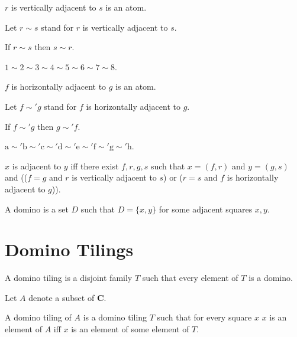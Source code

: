 \documentclass{article}
\newcommand{\fileA}{\mathrm{a}}
\newcommand{\fileB}{\mathrm{b}}
\newcommand{\fileC}{\mathrm{c}}
\newcommand{\fileD}{\mathrm{d}}
\newcommand{\fileE}{\mathrm{e}}
\newcommand{\fileF}{\mathrm{f}}
\newcommand{\fileG}{\mathrm{g}}
\newcommand{\fileH}{\mathrm{h}}
\newcommand{\vertadj}{\sim}
\newcommand{\horizadj}{\sim'} %
\newcommand{\Checkerboard}{\mathbf{C}}
\begin{document}
\begin{forthel}
    \begin{signature}
        $r$ is vertically adjacent to $s$ is an atom.
    \end{signature}
    Let $r\vertadj s$ stand for $r$ is vertically adjacent to $s$.

    \begin{axiom}
        If $r\vertadj s$ then $s\vertadj r$.
    \end{axiom}
    \begin{axiom}
        $1\vertadj 2\vertadj 3\vertadj 4\vertadj 5\vertadj 6\vertadj 7\vertadj 8$.
    \end{axiom}

    \begin{signature}
        $f$ is horizontally adjacent to $g$ is an atom.
    \end{signature}
    Let $f\horizadj g$ stand for $f$ is horizontally adjacent to $g$.

    \begin{axiom}
        If $f \horizadj g$ then $g \horizadj f$.
    \end{axiom}
    \begin{axiom}
        $\fileA \horizadj \fileB \horizadj \fileC \horizadj \fileD
        \horizadj \fileE \horizadj \fileF \horizadj \fileG \horizadj \fileH$.
    \end{axiom}

    \begin{definition}
        $x$ is adjacent to $y$ iff
        there exist $f, r, g, s$ such that
        $x = (f, r)$ and $y = (g, s)$ and
        (($f = g$ and $r$ is vertically adjacent to $s$) or
         ($r = s$ and $f$ is horizontally adjacent to $g$)).
    \end{definition}

    \begin{definition}
        A domino is a set $D$ such that $D = \{x,y\}$ for some
        adjacent squares $x, y$.
    \end{definition}
\end{forthel}



\section{Domino Tilings}

\begin{forthel}
    \begin{definition}
        A domino tiling is a disjoint family $T$ such that every element of $T$ is a domino.
    \end{definition}

    Let $A$ denote a subset of $\Checkerboard$.

    \begin{definition}
        A domino tiling of $A$ is a domino tiling $T$
        such that for every square $x$
        $x$ is an element of $A$ iff
        $x$ is an element of some element of $T$.
    \end{definition}
\end{forthel}
\end{document}
